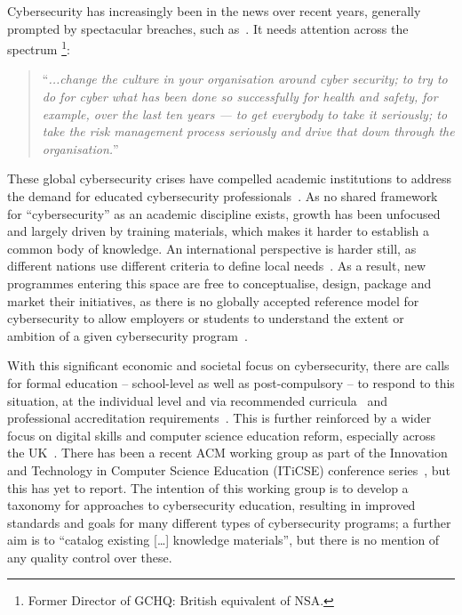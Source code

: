 \documentclass[conference]{IEEEtran}
\begin{document}
Cybersecurity has increasingly been in the news over recent years, generally prompted by spectacular breaches, such as~\cite{BritishAirways2018a}. It needs attention across the spectrum \cite{Hannigan2019a}\footnote{Former Director of GCHQ: British equivalent of NSA.}:
\begin{quote}
``{\emph{...change the culture in your organisation around cyber security; to try to do for cyber what has been done so successfully for health and safety, for example, over the last ten years --- to get everybody to take it seriously; to take the risk management process seriously and drive that down through the organisation.}}''
\end{quote}
\noindent
These global cybersecurity crises have compelled academic institutions to address the demand for educated cybersecurity professionals~\cite{McGettrick2013}. As no shared framework for ``cybersecurity'' as an academic discipline exists, growth has been unfocused and largely driven by training materials, which makes it harder to establish a common body of knowledge. An international perspective is harder still, as different nations use different criteria to define local needs~\cite{schneider2013}. As a result, new programmes entering this space are free to conceptualise, design, package and market their initiatives, as there is no globally accepted reference model for cybersecurity to allow employers or students to understand the extent or ambition of a given cybersecurity program~\cite{conklin-et-al:2014,Parrishetal2018a}.

With this significant economic and societal focus on cybersecurity, there are calls for formal education -- school-level as well as post-compulsory -- to respond to this situation, at the individual level and via recommended curricula~\cite{mcgettrick-et-al:sigcse2014,ACM2017b} and professional accreditation requirements~\cite{BCS2018a}. This is further reinforced by a wider focus on digital skills and computer science education reform, especially across the UK~\cite{brown-et-al:toce2014,murphy-et-al:programming2017,tryfonas+crick:petra2018}. There has been a recent ACM working group as part of the Innovation and Technology in Computer Science Education (ITiCSE) conference series~\cite{Parrishetal2018a}, but this has yet to report. The intention of this working group is to develop a taxonomy for approaches to cybersecurity education, resulting in improved standards and goals for many different types of cybersecurity programs; a further aim is to ``catalog existing [\dots] knowledge materials'', but there is no mention of any quality control over these.
\end{document}
